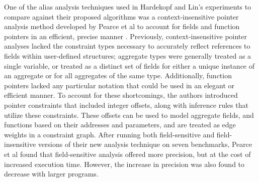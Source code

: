 One of the alias analysis techniques used in Hardekopf and Lin's experiments to compare against their proposed algorithms was a context-insensitive pointer analysis method developed by Pearce et al to account for fields and function pointers in an efficient, precise manner \cite{Pearce}. Previously, context-insensitive pointer analyses lacked the constraint types necessary to accurately reflect references to fields within user-defined structures; aggregate types were generally treated as a single variable, or treated as a distinct set of fields for either a unique instance of an aggregate or for all aggregates of the same type. Additionally, function pointers lacked any particular notation that could be used in an elegant or efficient manner. To account for these shortcomings, the authors introduced pointer constraints that included integer offsets, along with inference rules that utilize these constraints. These offsets can be used to model aggregate fields, and functions based on their addresses and parameters, and are treated as edge weights in a constraint graph. After running both field-sensitive and field-insensitive versions of their new analysis technique on seven benchmarks, Pearce et al found that field-sensitive analysis offered more precision, but at the cost of increased execution time. However, the increase in precision was also found to decrease with larger programs.
